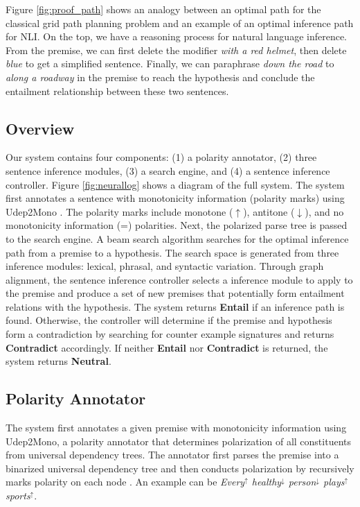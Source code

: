 \documentclass[11pt,a4paper]{article}
\begin{document}
Figure \ref{fig:proof_path} shows an analogy between an optimal path for the classical grid path planning problem and an example of an optimal inference path for NLI. On the top, we have a reasoning process for natural language inference. From the premise, we can first delete the modifier \textit{with a red helmet}, then delete \textit{blue} to get a simplified sentence. Finally, we can paraphrase \textit{down the road} to \textit{along a roadway} in the premise to reach the hypothesis and conclude the entailment relationship between these two sentences.

\subsection{Overview}
Our system contains four components: (1) a polarity annotator, (2) three sentence inference modules, (3) a search engine, and (4) a sentence inference controller. Figure \ref{fig:neurallog} shows a diagram of the full system. The system first annotates a sentence with monotonicity information (polarity marks) using Udep2Mono \cite{chengaoudep2mono}. The polarity marks include monotone ($\uparrow$), antitone ($\downarrow$), and no monotonicity information (=) polarities. Next, the polarized parse tree is passed to the search engine. A beam search algorithm searches for the optimal inference path from a premise to a hypothesis. The search space is generated from three inference modules: lexical, phrasal, and syntactic variation. Through graph alignment, the sentence inference controller selects a inference module to apply to the premise and produce a set of new premises that potentially form entailment relations with the hypothesis. The system returns \textbf{Entail} if an inference path is found. Otherwise, the controller will determine if the premise and hypothesis form a contradiction by searching for counter example signatures and returns \textbf{Contradict} accordingly. If neither \textbf{Entail} nor \textbf{Contradict} is returned, the system returns \textbf{Neutral}.

\subsection{Polarity Annotator}
The system first annotates a given premise with monotonicity information using Udep2Mono, a polarity annotator that determines polarization of all constituents
from universal dependency trees. The annotator first parses the premise into a binarized universal dependency tree and then conducts polarization by recursively marks polarity on each node . An example can be \textit{Every$^\uparrow$ healthy$^\downarrow$ person$^\downarrow$ plays$^\uparrow$ sports$^\uparrow$}.
\end{document}
